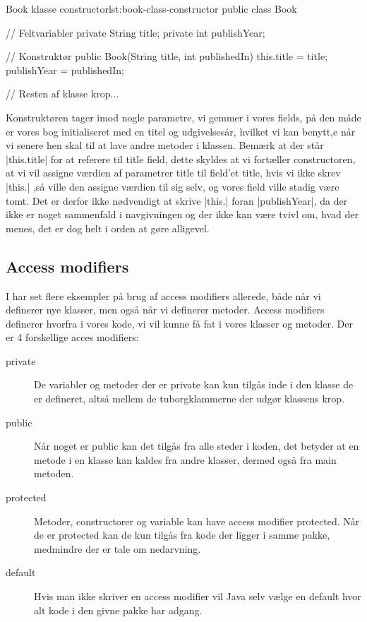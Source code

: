 \begin{JavaCode}{Book klasse constructor}{lst:book-class-constructor}
	public class Book {

		// Feltvariabler
		private String title;
		private int publishYear;

		// Konstruktør
		public Book(String title, int publishedIn) {
			this.title = title;
			publishYear = publishedIn;
		}

		// Resten af klasse krop...
	}
\end{JavaCode}

Konstruktøren tager imod nogle parametre, vi gemmer i vores fields, på
den måde er vores bog initialiseret med en titel og udgivelsesår,
hvilket vi kan benytt,e når vi senere hen skal til at lave andre
metoder i klassen. Bemærk at der står \JavaInline|this.title| for at
referere til title field, dette skyldes at vi fortæller constructoren,
at vi vil assigne værdien af parametrer title til field'et title, hvis
vi ikke skrev \JavaInline|this.| ,så ville den assigne værdien til sig
selv, og vores field ville stadig være tomt. Det er derfor ikke
nødvendigt at skrive \JavaInline|this.| foran
\JavaInline|publishYear|, da der ikke er noget sammenfald i
navgivningen og der ikke kan være tvivl om, hvad der menes, det er dog
helt i orden at gøre alligevel.

\subsection{Access modifiers}

I har set flere eksempler på brug af access modifiers allerede, både
når vi definerer nye klasser, men også når vi definerer metoder.
Access modifiers definerer hvorfra i vores kode, vi vil kunne få fat i
vores klasser og metoder. Der er 4 forskellige acces modifiers:

\begin{description}
\item [private]     De variabler og metoder der er private kan kun tilgås inde
                    i den klasse de er defineret, altså mellem de tuborgklammerne
                    der udgør klassens krop.
\item [public]      Når noget er public kan det tilgås fra alle steder i koden,
                    det betyder at en metode i en klasse kan kaldes fra andre
                    klasser, dermed også fra main metoden.
\item [protected]   Metoder, constructorer og variable kan have access modifier
                    protected. Når de er protected kan de kun tilgås fra kode
                    der ligger i samme pakke, medmindre der er tale om
                    nedarvning.
\item [default]     Hvis man ikke skriver en access modifier vil Java selv vælge
                    en default hvor alt kode i den givne pakke har adgang.
\end{description}


